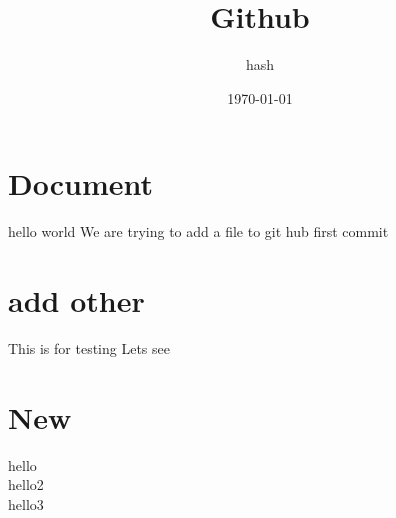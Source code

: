 \documentclass{report}
\title{Github}
\author{hash}
\date{\today}
\begin{document}
\maketitle
\section{Document}

hello world
We are trying to add a file to git hub
first commit


\section{add other}

This is for testing
Lets see

\section{New}

hello\\
hello2\\
hello3\\
\end{document}
